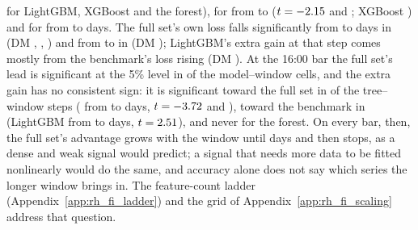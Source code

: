 \begin{itemize}
  \rhlcTRfOneTwoBar{} for LightGBM, XGBoost and the forest), for \rhlcSigNegTwoMainBarWho{} from \rhlcWTwo{} to
  \rhlcWMain{} ($t = -2.15$ and \rhlcTRfTwoMainBar; XGBoost \rhlcTXgbTwoMainBar) and for
  \rhlcSigNegMainLongBarWho{} from \rhlcWMain{} to \rhlcWLong{} days. The full set's own loss falls significantly
  from \rhlcWOne{} to \rhlcWTwo{} days in \rhlcFullFallOneTwoBarWho{} (DM \rhlcDmFullLgbmOneTwoBar,
  \rhlcDmFullXgbOneTwoBar, \rhlcDmFullRfOneTwoBar) and from \rhlcWTwo{} to \rhlcWMain{} in
  \rhlcFullFallTwoMainBarWho{} (DM \rhlcDmFullRfTwoMainBar); LightGBM's extra gain at that step comes mostly from
  the benchmark's loss rising (DM \rhlcDmHarLgbmTwoMainBar). At the 16:00 bar the full set's lead is significant at
  the 5\% level in \rhlcNGapSigClose{} of the \rhlcNGapCellsClose{} model--window cells, and the extra gain has no
  consistent sign: it is significant toward the full set in \rhlcNSigNegClose{} of the \rhlcNStepsClose{}
  tree--window steps (\rhlcSigNegTwoMainCloseWho{} from \rhlcWTwo{} to \rhlcWMain{} days, $t =
  -3.72$ and \rhlcTXgbTwoMainClose), toward the benchmark in \rhlcNSigPosClose{} (LightGBM from
  \rhlcWOne{} to \rhlcWTwo{} days, $t = 2.51$), and never for the forest. On every bar, then, the
  full set's advantage grows with the window until \rhlcWMain{} days and then stops, as a dense and weak signal
  would predict; a signal that needs more data to be fitted nonlinearly would do the same, and accuracy alone does
  not say which series the longer window brings in. The feature-count ladder (Appendix~\ref{app:rh_fi_ladder}) and
  the grid of Appendix~\ref{app:rh_fi_scaling} address that question.
\end{itemize}



